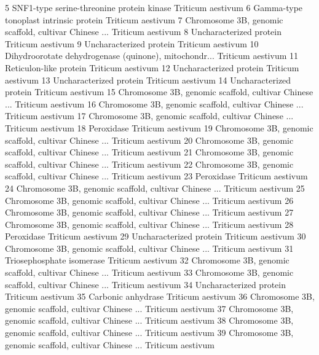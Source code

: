 \documentclass{beamer}
\begin{document}
\begin{frame}[fragile]
\begin{itemize}
\begin{Schunk}
\begin{Soutput}
5               SNF1-type serine-threonine protein kinase Triticum aestivum
6                  Gamma-type tonoplast intrinsic protein Triticum aestivum
7  Chromosome 3B, genomic scaffold, cultivar Chinese ...  Triticum aestivum
8                                 Uncharacterized protein Triticum aestivum
9                                 Uncharacterized protein Triticum aestivum
10 Dihydroorotate dehydrogenase (quinone), mitochondr...  Triticum aestivum
11                                 Reticulon-like protein Triticum aestivum
12                                Uncharacterized protein Triticum aestivum
13                                Uncharacterized protein Triticum aestivum
14                                Uncharacterized protein Triticum aestivum
15 Chromosome 3B, genomic scaffold, cultivar Chinese ...  Triticum aestivum
16 Chromosome 3B, genomic scaffold, cultivar Chinese ...  Triticum aestivum
17 Chromosome 3B, genomic scaffold, cultivar Chinese ...  Triticum aestivum
18                                             Peroxidase Triticum aestivum
19 Chromosome 3B, genomic scaffold, cultivar Chinese ...  Triticum aestivum
20 Chromosome 3B, genomic scaffold, cultivar Chinese ...  Triticum aestivum
21 Chromosome 3B, genomic scaffold, cultivar Chinese ...  Triticum aestivum
22 Chromosome 3B, genomic scaffold, cultivar Chinese ...  Triticum aestivum
23                                             Peroxidase Triticum aestivum
24 Chromosome 3B, genomic scaffold, cultivar Chinese ...  Triticum aestivum
25 Chromosome 3B, genomic scaffold, cultivar Chinese ...  Triticum aestivum
26 Chromosome 3B, genomic scaffold, cultivar Chinese ...  Triticum aestivum
27 Chromosome 3B, genomic scaffold, cultivar Chinese ...  Triticum aestivum
28                                             Peroxidase Triticum aestivum
29                                Uncharacterized protein Triticum aestivum
30 Chromosome 3B, genomic scaffold, cultivar Chinese ...  Triticum aestivum
31                              Triosephosphate isomerase Triticum aestivum
32 Chromosome 3B, genomic scaffold, cultivar Chinese ...  Triticum aestivum
33 Chromosome 3B, genomic scaffold, cultivar Chinese ...  Triticum aestivum
34                                Uncharacterized protein Triticum aestivum
35                                     Carbonic anhydrase Triticum aestivum
36 Chromosome 3B, genomic scaffold, cultivar Chinese ...  Triticum aestivum
37 Chromosome 3B, genomic scaffold, cultivar Chinese ...  Triticum aestivum
38 Chromosome 3B, genomic scaffold, cultivar Chinese ...  Triticum aestivum
39 Chromosome 3B, genomic scaffold, cultivar Chinese ...  Triticum aestivum

\end{Soutput}
\end{Schunk}
\end{itemize}
\end{frame}
\end{document}
